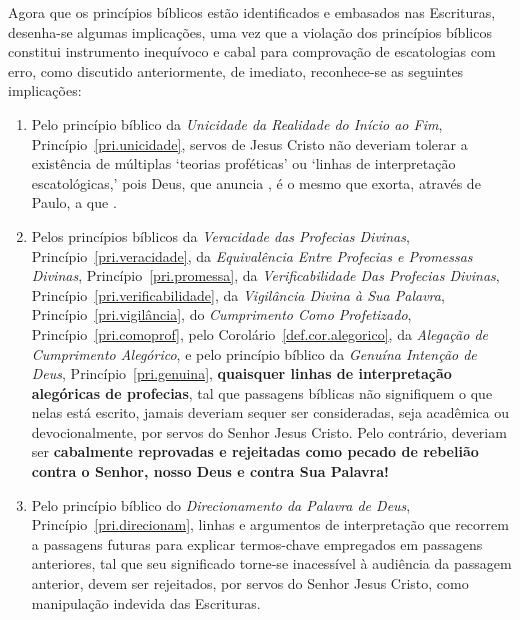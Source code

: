     Agora que os princípios bíblicos estão identificados e embasados nas Escrituras, desenha-se algumas implicações, uma vez que
    a violação dos princípios bíblicos constitui instrumento inequívoco e cabal para comprovação de escatologias com erro,  como
    discutido anteriormente, de imediato, reconhece-se as seguintes implicações:

    \begin{enumerate}

        \item   Pelo   princípio   bíblico   da    \emph{Unicidade    da    Realidade    do    Início    ao    Fim},
            Princípio~\ref{pri.unicidade}, servos de Jesus Cristo não deveriam tolerar  a  existência  de  múltiplas
            `teorias proféticas' ou `linhas de interpretação escatológicas,' pois Deus, que anuncia ,
            é o mesmo que exorta, através de Paulo, a que .

        \item Pelos princípios bíblicos da \emph{Veracidade das Profecias Divinas},  Princípio~\ref{pri.veracidade},
            da  \emph{Equivalência  Entre  Profecias  e   Promessas   Divinas},   Princípio~\ref{pri.promessa},   da
            \emph{Verificabilidade Das Profecias Divinas}, Princípio~\ref{pri.verificabilidade}, da \emph{Vigilância
            Divina  à  Sua  Palavra},  Princípio~\ref{pri.vigilância},  do  \emph{Cumprimento   Como   Profetizado},
            Princípio~\ref{pri.comoprof}, pelo Corolário~\ref{def.cor.alegorico}, da \emph{Alegação  de  Cumprimento
            Alegórico}, e pelo princípio bíblico da \emph{Genuína Intenção  de  Deus},  Princípio~\ref{pri.genuina},
            \textbf{quaisquer linhas de interpretação alegóricas de  profecias},  tal  que  passagens  bíblicas  não
            signifiquem o que nelas está escrito,  jamais  deveriam  sequer  ser  consideradas,  seja  acadêmica  ou
            devocionalmente, por servos do Senhor Jesus Cristo.  Pelo  contrário,  deveriam  ser  \textbf{cabalmente
            reprovadas e rejeitadas como pecado de rebelião contra o Senhor, nosso Deus e contra Sua Palavra!}

        \item Pelo princípio bíblico do \emph{Direcionamento da Palavra  de  Deus},  Princípio~\ref{pri.direcionam},
            linhas e argumentos de interpretação  que  recorrem  a  passagens  futuras  para  explicar  termos-chave
            empregados em passagens anteriores, tal que seu significado torne-se inacessível à audiência da passagem
            anterior, devem ser rejeitados, por servos  do  Senhor  Jesus  Cristo,  como  manipulação  indevida  das
            Escrituras.

    \end{enumerate}


